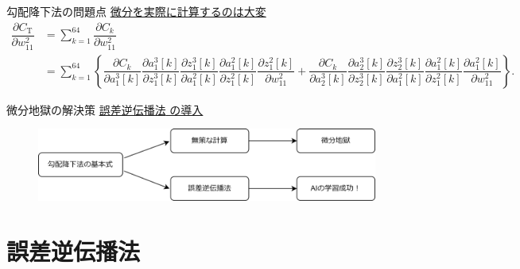 \documentclass[dvipdfmx,aspectratio=169]{beamer}
\begin{document}
	\begin{frame}{勾配降下法の問題点}
		\underline{微分を実際に計算するのは大変}
		\begin{align*}
			\dfrac{\partial C_\mathrm{T}}{\partial w^2_{11}} 
			&= \sum_{k=1}^{64} \dfrac{\partial C_k}{\partial w^2_{11}}\\
			&= \sum_{k=1}^{64}\left\{ \dfrac{\partial C_k}{\partial a^3_1[k]}\dfrac{\partial a^3_1[k]}{\partial z^3_1[k]}\dfrac{\partial z^3_1[k]}{\partial a^2_1[k]}\dfrac{\partial a^2_1[k]}{\partial z^2_1[k]}\dfrac{\partial z^2_1[k]}{\partial w^2_{11}} + \dfrac{\partial C_k}{\partial a^3_2[k]}\dfrac{\partial a^3_2[k]}{\partial z^3_2[k]}\dfrac{\partial z^3_2[k]}{\partial a^2_1[k]}\dfrac{\partial a^2_1[k]}{\partial z^2_1[k]}\dfrac{\partial a^2_1[k]}{\partial w^2_{11}} \right\}.
		\end{align*}
	\end{frame}
	\begin{frame}{微分地獄の解決策}
		\underline{\alert{誤差逆伝播法} の導入}
		\begin{figure}
			\centering
			\includegraphics[width=0.9\linewidth]{img/positioning-of-the-error-back-propagation-method}
		\end{figure}
	\end{frame}
	
	\section{誤差逆伝播法}
\end{document}
